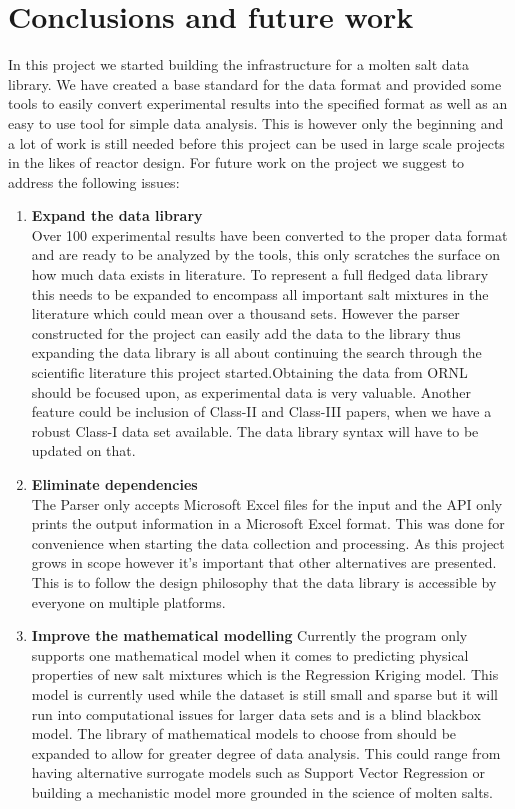 \section{Conclusions and future work}
In this project we started building the infrastructure for a molten salt data library. We have created a base standard for the data format and provided some tools to easily convert experimental results into the specified format as well as an easy to use tool for simple data analysis. This is however only the beginning and a lot of work is still needed before this project can be used in large scale projects in the likes of reactor design. For future work on the project we suggest to address the following issues:

\begin{enumerate}
    \item \textbf{Expand the data library} \\
    Over 100 experimental results have been converted to the proper data format and are ready to be analyzed by the tools, this only scratches the surface on how much data exists in literature. To represent a full fledged data library this needs to be expanded to encompass all important salt mixtures in the literature which could mean over a thousand sets. However the parser constructed for the project can easily add the data to the library thus expanding the data library is all about continuing the search through the scientific literature this project started.Obtaining the data from ORNL should be focused upon, as experimental data is very valuable. Another feature could be inclusion of Class-II and Class-III papers, when we have a robust Class-I data set available. The data library syntax will have to be updated on that. 
    \item \textbf{Eliminate dependencies} \\
    The Parser only accepts Microsoft Excel files for the input and the API only prints the output information in a Microsoft Excel format. This was done for convenience when starting the data collection and processing. As this project grows in scope however it's important that other alternatives are presented. This is to follow the design philosophy that the data library is accessible by everyone on multiple platforms.
    \item \textbf{Improve the mathematical modelling}
    Currently the program only supports one mathematical model when it comes to predicting physical properties of new salt mixtures which is the Regression Kriging model. This model is currently used while the dataset is still small and sparse but it will run into computational issues for larger data sets and is a blind blackbox model. The library of mathematical models to choose from should be expanded to allow for greater degree of data analysis. This could range from having alternative surrogate models such as Support Vector Regression or building a mechanistic model more grounded in the science of molten salts.

\end{enumerate}
